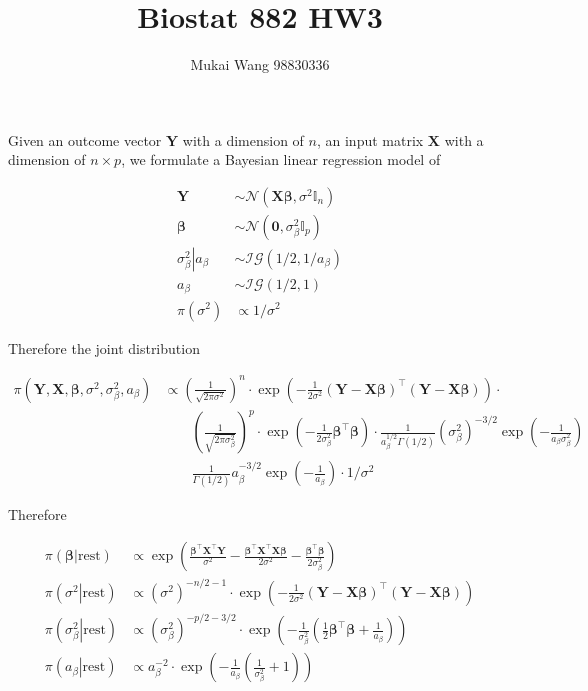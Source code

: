 \documentclass[12pt]{article}
\title{Biostat 882 HW3}
\date{}
\author{Mukai Wang 98830336}
\begin{document}
\maketitle

Given an outcome vector $\bm{Y}$ with a dimension of $n$, an input matrix $\bm{X}$ with a dimension of $n\times p$, we formulate a Bayesian linear regression model of 

\begin{align*}
	\bm{Y} &\sim \mathcal{N}\left(\bm{X}\bm{\beta}, \sigma^2 \mathbb{I}_{n} \right)\\
	\bm{\beta} & \sim \mathcal{N}(\bm{0}, \sigma_{\beta}^2 \mathbb{I}_p)\\
	\left.\sigma_{\beta}^2 \right\vert a_\beta &\sim \mathcal{IG}(1/2, 1/a_\beta)\\
	a_\beta & \sim \mathcal{IG}(1/2, 1)\\
	\pi(\sigma^2) & \propto 1/\sigma^2
\end{align*}

Therefore the joint distribution 

\begin{align*}
	\pi(\bm{Y}, \bm{X}, \bm{\beta}, \sigma^2, \sigma_{\beta}^2, a_\beta) & \propto \left(\frac{1}{\sqrt{2\pi \sigma^2}} \right)^n \cdot \exp( -\frac{1}{2\sigma^2}(\bm{Y} - \bm{X}\bm{\beta})^\top (\bm{Y} - \bm{X}\bm{\beta}) ) \cdot \\
	& \qquad \left( \frac{1}{\sqrt{2\pi \sigma_{\beta}^2}} \right)^p \cdot \exp(-\frac{1}{2\sigma_{\beta}^2} \bm{\beta}^\top \bm{\beta})\cdot \frac{1}{a_{\beta}^{1/2}\Gamma(1/2) } (\sigma_{\beta}^{2})^{-3/2}\exp(-\frac{1}{a_\beta \sigma_{\beta}^2})\\
	&\qquad \frac{1}{\Gamma(1/2)}a_{\beta}^{-3/2}\exp(-\frac{1}{a_\beta})\cdot 1/\sigma^2
\end{align*}

Therefore

\begin{align*}
	\pi\left(\left.\bm{\beta}\right\vert\text{rest}\right) &\propto \exp(\frac{\bm{\beta}^\top\bm{X}^\top\bm{Y}}{\sigma^2}-\frac{\bm{\beta}^\top \bm{X}^\top \bm{X} \bm{\beta}}{2\sigma^2} - \frac{\bm{\beta}^\top \bm{\beta}}{2\sigma_{\beta}^2} ) \\
	\pi\left(\left.\sigma^2\right\vert\text{rest}\right) &\propto (\sigma^2)^{-n/2-1}\cdot \exp( -\frac{1}{2\sigma^2}(\bm{Y} - \bm{X}\bm{\beta})^\top (\bm{Y} - \bm{X}\bm{\beta}) )\\
	\pi\left(\left.\sigma_{\beta}^2\right\vert\text{rest}\right) & \propto (\sigma_{\beta}^2)^{-p/2-3/2}\cdot \exp(-\frac{1}{\sigma_{\beta}^2} \left(\frac{1}{2}\bm{\beta}^\top \bm{\beta} + \frac{1}{a_\beta} \right)) \\
	\pi\left(\left.a_{\beta}\right\vert\text{rest}\right) & \propto a_{\beta}^{-2}\cdot \exp(-\frac{1}{a_\beta} \left(\frac{1}{\sigma_{\beta}^2} + 1\right))
\end{align*}
\end{document}
